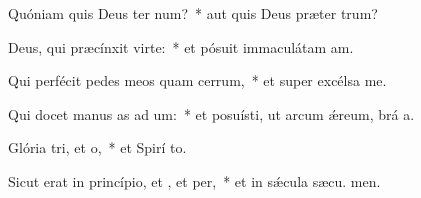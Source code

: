 \item Quóniam quis Deus ter num?~* aut quis Deus præter  trum?
\item Deus, qui præcínxit  virte:~* et pósuit immaculátam  am.
\item Qui perfécit pedes meos quam cerrum,~* et super excélsa  me.
\item Qui docet manus as ad um:~* et posuísti, ut arcum ǽreum, brá a.
\item Glória tri, et o,~* et Spirí to.
\item Sicut erat in princípio, et , et per,~* et in sǽcula sæcu. men.
